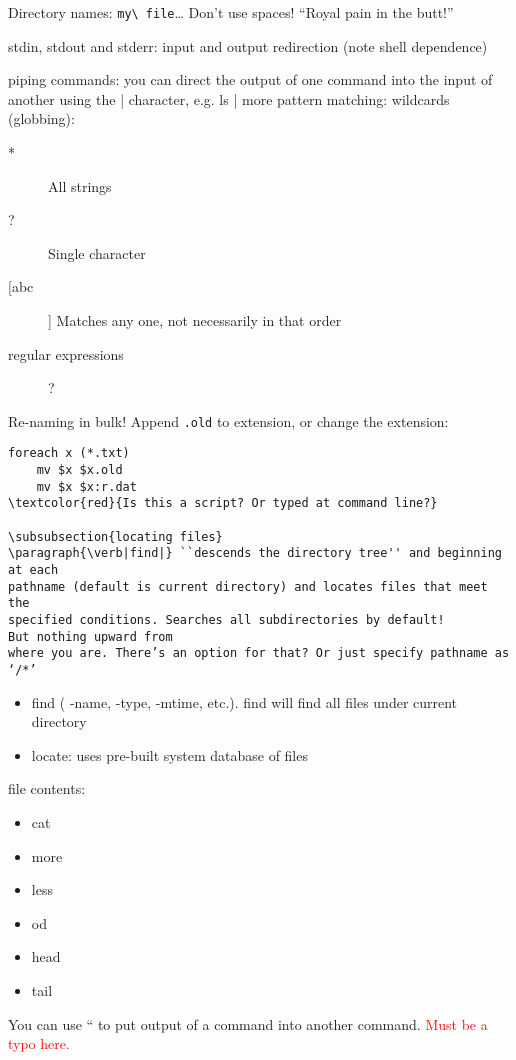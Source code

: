 \documentclass{article}
\begin{document}
Directory names: \verb|my\ file|\ldots
Don't use spaces! ``Royal pain in the butt!''

stdin, stdout and stderr: input and output redirection (note shell
dependence)

piping commands: you can direct the output of one command into the
input of another using the | character, e.g. ls | more
pattern matching: wildcards (globbing):
\begin{description}
    \item [*] All strings
    \item [?] Single character
    \item [[abc]] Matches any one, not necessarily in that order
    \item [regular expressions] ?
\end{description}
Re-naming in bulk! Append \verb|.old| to extension, or change the extension:
\begin{verbatim}
foreach x (*.txt)
    mv $x $x.old
    mv $x $x:r.dat
\textcolor{red}{Is this a script? Or typed at command line?}

\subsubsection{locating files}
\paragraph{\verb|find|} ``descends the directory tree'' and beginning at each
pathname (default is current directory) and locates files that meet the
specified conditions. Searches all subdirectories by default!
But nothing upward from
where you are. There’s an option for that? Or just specify pathname as ‘/*’
\end{verbatim}
\begin{itemize}
    \item find ( -name, -type, -mtime, etc.). find will find all files
        under current directory
    \item locate: uses pre-built system database of files
\end{itemize}

file contents:
\begin{itemize}
    \item cat
    \item more
    \item less
    \item od
    \item head
    \item tail
\end{itemize}
You can use `` to put output of a command into another command.
\textcolor{red}{Must be a typo here.}
\end{document}
